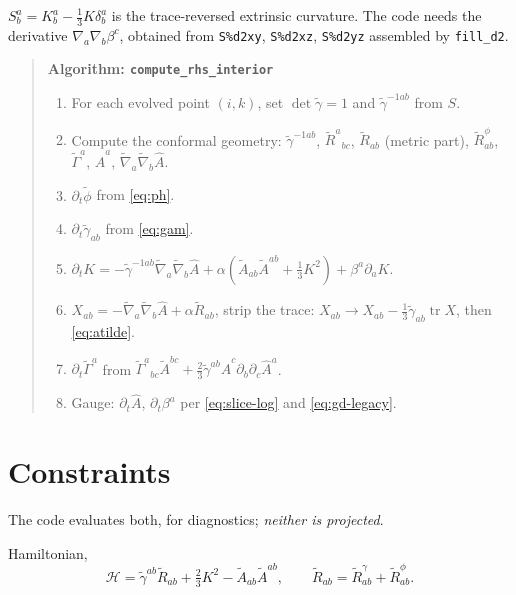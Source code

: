 \documentclass[11pt,openany]{book}
\newcommand{\ph}{\tilde{\phi}}
\newcommand{\At}{\tilde{A}}
\newcommand{\etr}{\tilde{\gamma}}
\newcommand{\etrT}{\tilde{\gamma}^{ab}}
\DeclareMathOperator{\tr}{tr}
\begin{document}
$S^a_b = K^a_b - \tfrac{1}{3}K\delta^a_b$ is the trace-reversed extrinsic
curvature. The code needs the derivative $\nabla_a\nabla_b\beta^c$, obtained
from \texttt{S\%d2xy}, \texttt{S\%d2xz}, \texttt{S\%d2yz} assembled by
\texttt{fill\_d2}.

\begin{quote}\small
\textbf{Algorithm: \texttt{compute\_rhs\_interior}}
\begin{enumerate}
\item For each evolved point $(i,k)$, set $\det\etr = 1$ and
      $\etr^{-1ab}$ from $S$.
\item Compute the conformal geometry:
      $\etr^{-1ab}$, $\tilde{R}^a{}_{bc}$,
      $\tilde{R}_{ab}$ (metric part), $\tilde{R}^\phi_{ab}$,
      $\tilde{\Gamma}^a$, $\hat{A}^a$, $\tilde{\nabla}_a\tilde{\nabla}_b\hat{A}$.
\item $\partial_t\ph$ from \eqref{eq:ph}.
\item $\partial_t\etr_{ab}$ from \eqref{eq:gam}.
\item $\partial_t K = -\etr^{-1ab}\tilde{\nabla}_a\tilde{\nabla}_b\hat{A}
      + \alpha\left(\At_{ab}\At^{ab} + \tfrac{1}{3}K^2\right)
      + \beta^a\partial_a K$.
\item $X_{ab} = -\tilde{\nabla}_a\tilde{\nabla}_b\hat{A} + \alpha\tilde{R}_{ab}$,
      strip the trace: $X_{ab} \to X_{ab} - \tfrac{1}{3}\etr_{ab}\tr X$, then
      \eqref{eq:atilde}.
\item $\partial_t\tilde{\Gamma}^a$ from
      $\tilde{\Gamma}^a{}_{bc}\At^{bc} + \tfrac{2}{3}\etr^{ab}\hat{A}^c
      \partial_b\partial_c\hat{A}^a$.
\item Gauge: $\partial_t\hat{A}$, $\partial_t\beta^a$ per \eqref{eq:slice-log} and \eqref{eq:gd-legacy}.
\end{enumerate}
\end{quote}

\section{Constraints}

The code evaluates both, for diagnostics; \emph{neither is projected}.

Hamiltonian, 
\begin{equation}
\label{eq:H}
\mathcal{H} = \etrT\tilde{R}_{ab}
  + \tfrac{2}{3}K^2 - \At_{ab}\At^{ab},
\qquad
\tilde{R}_{ab} = \tilde{R}^{\gamma}_{ab} + \tilde{R}^{\phi}_{ab}.
\end{equation}
\end{document}
